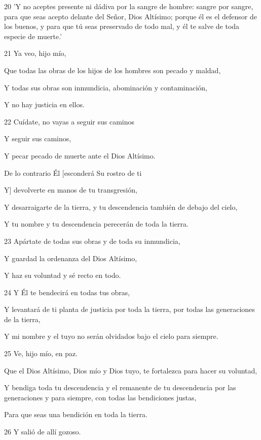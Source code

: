 \par 20 'Y no aceptes presente ni dádiva por la sangre de hombre: sangre por sangre, para que seas acepto delante del Señor, Dios Altísimo; porque él es el defensor de los buenos, y para que tú seas preservado de todo mal, y él te salve de toda especie de muerte.'
\par    
\par 21 Ya veo, hijo mío,  
\par     Que todas las obras de los hijos de los hombres son pecado y maldad,  
\par     Y todas sus obras son inmundicia, abominación y contaminación,  
\par     Y no hay justicia en ellos.
\par    
\par 22 Cuídate, no vayas a seguir sus caminos  
\par     Y seguir sus caminos,  
\par     Y pecar pecado de muerte ante el Dios Altísimo.
\par    
\par     De lo contrario Él [esconderá Su rostro de ti  
\par     Y] devolverte en manos de tu transgresión,  
\par     Y desarraigarte de la tierra, y tu descendencia también de debajo del cielo,  
\par     Y tu nombre y tu descendencia perecerán de toda la tierra.
\par    
\par 23 Apártate de todas sus obras y de toda su inmundicia,  
\par     Y guardad la ordenanza del Dios Altísimo,  
\par     Y haz su voluntad y sé recto en todo.
\par    
\par 24 Y Él te bendecirá en todas tus obras,  
\par     Y levantará de ti planta de justicia por toda la tierra, por todas las generaciones de la tierra,  
\par     Y mi nombre y el tuyo no serán olvidados bajo el cielo para siempre.
\par    
\par 25 Ve, hijo mío, en paz.  
\par     Que el Dios Altísimo, Dios mío y Dios tuyo, te fortalezca para hacer su voluntad,  
\par     Y bendiga toda tu descendencia y el remanente de tu descendencia por las generaciones y para siempre, con todas las bendiciones justas,  
\par     Para que seas una bendición en toda la tierra.
\par    
\par 26 Y salió de allí gozoso.


